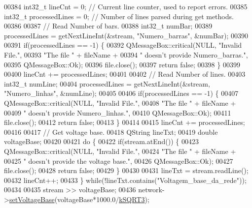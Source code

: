 \begin{DoxyCode}
00384   int32\_t lineCnt = 0; \textcolor{comment}{// Current line counter, used to report errors.}
00385   int32\_t processedLines = 0; \textcolor{comment}{// Number of lines parsed during get methods.}
00386 
00387   \textcolor{comment}{// Read Number of bars.}
00388   int32\_t numBar;
00389   processedLines = getNextLineInt(&stream, \textcolor{stringliteral}{"Numero\_barras"}, &numBar);
00390 
00391   \textcolor{keywordflow}{if}(processedLines == -1) \{
00392     QMessageBox::critical(NULL, \textcolor{stringliteral}{"Invalid File."},
00393                           \textcolor{stringliteral}{"The file "} + fileName +
00394                           \textcolor{stringliteral}{" doesn't provide Numero\_barras."},
00395                           QMessageBox::Ok);
00396     file.close();
00397     \textcolor{keywordflow}{return} \textcolor{keyword}{false};
00398   \}
00399 
00400   lineCnt += processedLines;
00401 
00402   \textcolor{comment}{// Read Number of lines.}
00403   int32\_t numLine;
00404   processedLines = getNextLineInt(&stream, \textcolor{stringliteral}{"Numero\_linhas"}, &numLine);
00405 
00406   \textcolor{keywordflow}{if}(processedLines == -1) \{
00407     QMessageBox::critical(NULL, \textcolor{stringliteral}{"Invalid File."},
00408                           \textcolor{stringliteral}{"The file "} + fileName +
00409                           \textcolor{stringliteral}{" doesn't provide Numero\_linhas."},
00410                           QMessageBox::Ok);
00411     file.close();
00412     \textcolor{keywordflow}{return} \textcolor{keyword}{false};
00413   \}
00414 
00415   lineCnt += processedLines;
00416 
00417   \textcolor{comment}{// Get voltage base.}
00418   QString lineTxt;
00419   \textcolor{keywordtype}{double} voltageBase;
00420 
00421   \textcolor{keywordflow}{do} \{
00422     \textcolor{keywordflow}{if}(stream.atEnd()) \{
00423       QMessageBox::critical(NULL, \textcolor{stringliteral}{"Invalid File."},
00424                             \textcolor{stringliteral}{"The file "} + fileName +
00425                             \textcolor{stringliteral}{" doesn't provide the voltage base."},
00426                             QMessageBox::Ok);
00427       file.close();
00428       \textcolor{keywordflow}{return} \textcolor{keyword}{false};
00429     \}
00430 
00431     lineTxt = stream.readLine();
00432     lineCnt++;
00433   \} \textcolor{keywordflow}{while}(!lineTxt.contains(\textcolor{stringliteral}{"Voltagem\_base\_da\_rede"}));
00434 
00435   stream >> voltageBase;
00436   network->\hyperlink{group___models_gac2787bb9c323716baa2e6fba06136f2b}{setVoltageBase}(voltageBase*1000.0/\hyperlink{math__constants_8h_a987f07b0b550988e3f3f9fb36d74142e}{kSQRT3});

\end{DoxyCode}

